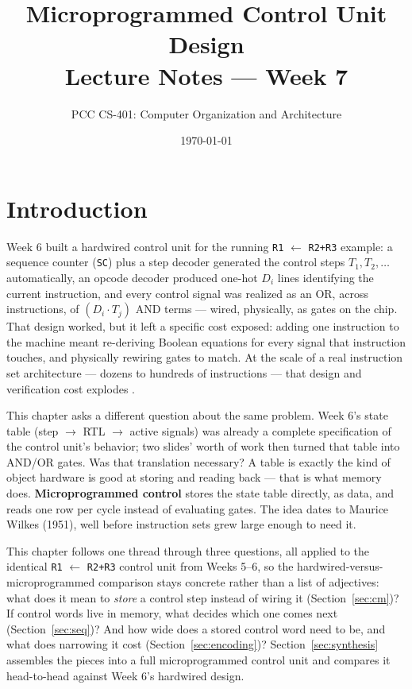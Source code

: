 \documentclass[11pt]{article}
\title{Microprogrammed Control Unit Design\\\large Lecture Notes --- Week 7}
\author{PCC CS-401: Computer Organization and Architecture}
\date{\today}
\begin{document}
\maketitle

\section{Introduction}

Week 6 built a hardwired control unit for the running \texttt{R1} $\gets$ \texttt{R2+R3} example: a sequence counter (\texttt{SC}) plus a step decoder generated the control steps $T_1, T_2, \dots$ automatically, an opcode decoder produced one-hot $D_i$ lines identifying the current instruction, and every control signal was realized as an OR, across instructions, of $(D_i \cdot T_j)$ AND terms --- wired, physically, as gates on the chip. That design worked, but it left a specific cost exposed: adding one instruction to the machine meant re-deriving Boolean equations for every signal that instruction touches, and physically rewiring gates to match. At the scale of a real instruction set architecture --- dozens to hundreds of instructions --- that design and verification cost explodes \cite{Stallings2015_computer_organization}.

This chapter asks a different question about the same problem. Week 6's state table (step $\to$ RTL $\to$ active signals) was already a complete specification of the control unit's behavior; two slides' worth of work then turned that table into AND/OR gates. Was that translation necessary? A table is exactly the kind of object hardware is good at storing and reading back --- that is what memory does. \textbf{Microprogrammed control} stores the state table directly, as data, and reads one row per cycle instead of evaluating gates. The idea dates to Maurice Wilkes (1951), well before instruction sets grew large enough to need it.

This chapter follows one thread through three questions, all applied to the identical \texttt{R1} $\gets$ \texttt{R2+R3} control unit from Weeks 5--6, so the hardwired-versus-microprogrammed comparison stays concrete rather than a list of adjectives: what does it mean to \emph{store} a control step instead of wiring it (Section~\ref{sec:cm})? If control words live in memory, what decides which one comes next (Section~\ref{sec:seq})? And how wide does a stored control word need to be, and what does narrowing it cost (Section~\ref{sec:encoding})? Section~\ref{sec:synthesis} assembles the pieces into a full microprogrammed control unit and compares it head-to-head against Week 6's hardwired design.
\end{document}
